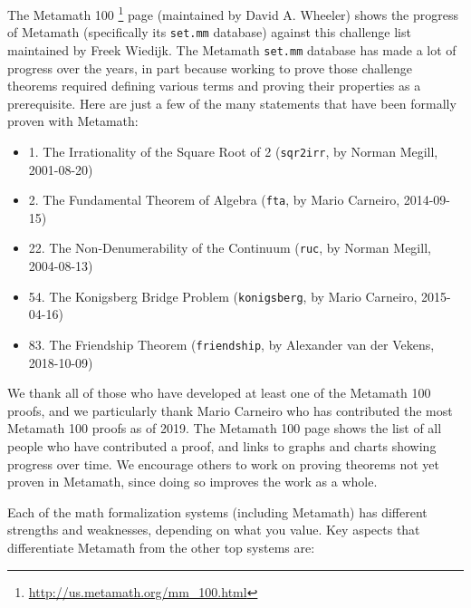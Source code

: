 The Metamath 100%
\footnote{\url{http://us.metamath.org/mm\_100.html}}
page (maintained by David A. Wheeler)
shows the progress of Metamath (specifically its \texttt{set.mm} database)
against this challenge list maintained by Freek Wiedijk.
The Metamath \texttt{set.mm} database
has made a lot of progress over the years,
in part because working to prove those challenge theorems required
defining various terms and proving their properties as a prerequisite.
Here are just a few of the many statements that have been
formally proven with Metamath:

\begin{flushleft}
\begin{itemize}
\item 1. The Irrationality of the Square Root of 2
  (\texttt{sqr2irr}, by Norman Megill, 2001-08-20)
\item 2. The Fundamental Theorem of Algebra
  (\texttt{fta}, by Mario Carneiro, 2014-09-15)
\item 22. The Non-Denumerability of the Continuum
  (\texttt{ruc}, by Norman Megill, 2004-08-13)
\item 54. The Konigsberg Bridge Problem
  (\texttt{konigsberg}, by Mario Carneiro, 2015-04-16)
\item 83. The Friendship Theorem
  (\texttt{friendship}, by Alexander van der Vekens, 2018-10-09)
\end{itemize}
\end{flushleft}

We thank all of those who have developed at least one of the Metamath 100
proofs, and we particularly thank
Mario Carneiro
who has contributed the most Metamath 100 proofs as of 2019.
The Metamath 100 page shows the list of all people who have contributed a
proof, and links to graphs and charts showing progress over time.
We encourage others to work on proving theorems not yet proven in Metamath,
since doing so improves the work as a whole.

Each of the math formalization systems (including Metamath)
has different strengths and weaknesses, depending on what you value.
Key aspects that differentiate Metamath from the other top systems are:

